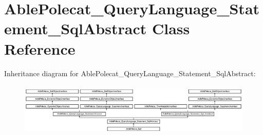 \hypertarget{class_able_polecat___query_language___statement___sql_abstract}{}\section{Able\+Polecat\+\_\+\+Query\+Language\+\_\+\+Statement\+\_\+\+Sql\+Abstract Class Reference}
\label{class_able_polecat___query_language___statement___sql_abstract}
Inheritance diagram for Able\+Polecat\+\_\+\+Query\+Language\+\_\+\+Statement\+\_\+\+Sql\+Abstract\+:\begin{figure}[H]
\begin{center}
\leavevmode
\includegraphics[height=2.553191cm]{class_able_polecat___query_language___statement___sql_abstract}
\end{center}
\end{figure}
